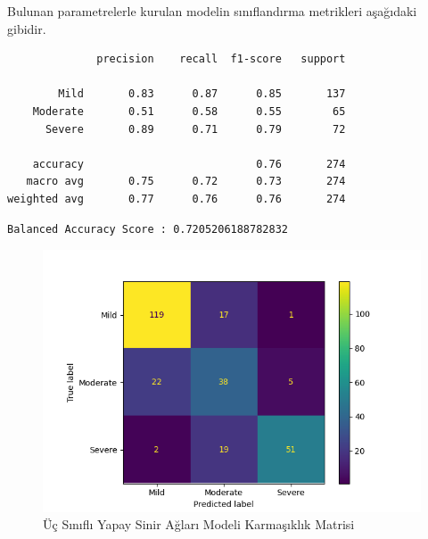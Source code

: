 \documentclass[12pt,twoside]{deuthesis}
\begin{document}
Bulunan parametrelerle kurulan modelin sınıflandırma metrikleri aşağıdaki gibidir.
\begin{verbatim}
              precision    recall  f1-score   support

        Mild       0.83      0.87      0.85       137
    Moderate       0.51      0.58      0.55        65
      Severe       0.89      0.71      0.79        72

    accuracy                           0.76       274
   macro avg       0.75      0.72      0.73       274
weighted avg       0.77      0.76      0.76       274
\end{verbatim}
\begin{verbatim}
Balanced Accuracy Score : 0.7205206188782832
\end{verbatim}
\begin{figure}

{\centering \includegraphics[width=1.05\linewidth,height=0.6\textheight]{figure/nn_conf} 

}

\caption{Üç Sınıflı Yapay Sinir Ağları Modeli Karmaşıklık Matrisi}\label{fig:unnamed-chunk-48}
\end{figure}
\end{document}
